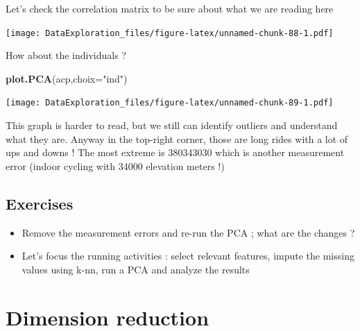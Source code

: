 \documentclass[
]{book}
\newenvironment{Shaded}{\begin{snugshade}}{\end{snugshade}}
\newcommand{\DataTypeTok}[1]{\textcolor[rgb]{0.13,0.29,0.53}{#1}}
\newcommand{\KeywordTok}[1]{\textcolor[rgb]{0.13,0.29,0.53}{\textbf{#1}}}
\newcommand{\NormalTok}[1]{#1}
\newcommand{\OperatorTok}[1]{\textcolor[rgb]{0.81,0.36,0.00}{\textbf{#1}}}
\newcommand{\StringTok}[1]{\textcolor[rgb]{0.31,0.60,0.02}{#1}}
\providecommand{\tightlist}{%
  \setlength{\itemsep}{0pt}\setlength{\parskip}{0pt}}
\begin{document}
Let's check the correlation matrix to be sure about what we are reading here

\begin{Shaded}
\end{Shaded}

\texttt{[image: DataExploration\_files/figure-latex/unnamed-chunk-88-1.pdf]}

How about the individuals ?

\begin{Shaded}
\begin{Highlighting}[]
\KeywordTok{plot.PCA}\NormalTok{(acp,}\DataTypeTok{choix=}\StringTok{"ind"}\NormalTok{)}
\end{Highlighting}
\end{Shaded}

\texttt{[image: DataExploration\_files/figure-latex/unnamed-chunk-89-1.pdf]}

This graph is harder to read, but we still can identify outliers and understand what they are. Anyway in the top-right corner, those are long rides with a lot of ups and downs ! The most extreme is 380343030 which is another measurement error (indoor cycling with 34000 elevation meters !)

\hypertarget{exercises}{%
\subsection{Exercises}\label{exercises}}

\begin{itemize}
\tightlist
\item
  Remove the measurement errors and re-run the PCA ; what are the changes ?
\item
  Let's focus the running activities : select relevant features, impute the missing values using k-nn, run a PCA and analyze the results
\end{itemize}

\hypertarget{dimension-reduction}{%
\section{Dimension reduction}\label{dimension-reduction}}
\end{document}
